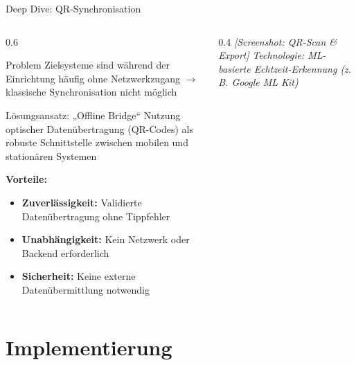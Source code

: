 \documentclass[10pt]{beamer}
\begin{document}
\begin{frame}{Deep Dive: QR-Synchronisation}
    \begin{columns}
        \begin{column}{0.6\textwidth}
            \begin{block}{Problem}
                Zielsysteme sind während der Einrichtung häufig ohne Netzwerkzugang $\rightarrow$ klassische Synchronisation nicht möglich
            \end{block}
            
            \begin{block}{Lösungsansatz: „Offline Bridge“}
                Nutzung optischer Datenübertragung (QR-Codes) als robuste Schnittstelle zwischen mobilen und stationären Systemen
            \end{block}
            
            \textbf{Vorteile:}
            \begin{itemize}
                \item \textbf{Zuverlässigkeit:} Validierte Datenübertragung ohne Tippfehler
                \item \textbf{Unabhängigkeit:} Kein Netzwerk oder Backend erforderlich
                \item \textbf{Sicherheit:} Keine externe Datenübermittlung notwendig
            \end{itemize}
        \end{column}
        
        \begin{column}{0.4\textwidth}
            \centering
            \textit{[Screenshot: QR-Scan \& Export]}
            \vfill
            \small{\textit{Technologie: ML-basierte Echtzeit-Erkennung (z.\,B. Google ML Kit)}}
        \end{column}
    \end{columns}
\end{frame}

\section{Implementierung}
\end{document}
